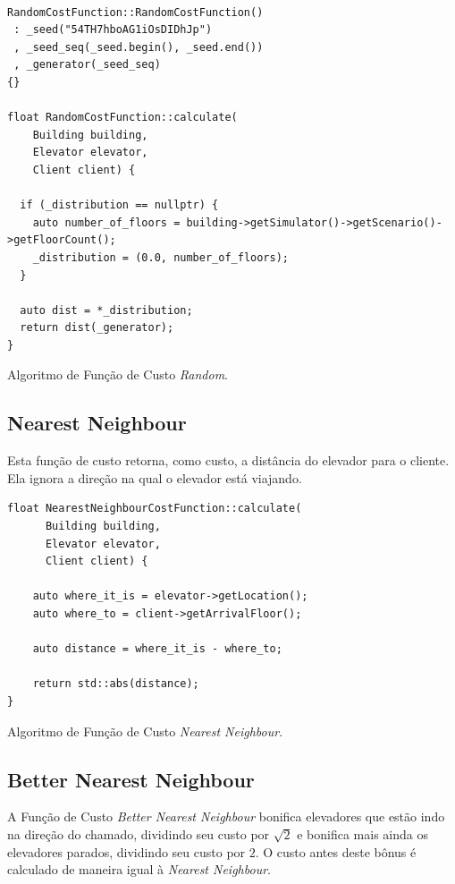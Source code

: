 \begin{algorithm}[htb!]
  \centering
  \begin{verbatim}

RandomCostFunction::RandomCostFunction()
 : _seed("54TH7hboAG1iOsDIDhJp")
 , _seed_seq(_seed.begin(), _seed.end())
 , _generator(_seed_seq)
{}

float RandomCostFunction::calculate(
    Building building,
    Elevator elevator,
    Client client) {

  if (_distribution == nullptr) {
    auto number_of_floors = building->getSimulator()->getScenario()->getFloorCount();
    _distribution = (0.0, number_of_floors);
  }

  auto dist = *_distribution;
  return dist(_generator);
}
  \end{verbatim}
  \caption{\label{alg:random_cf}Algoritmo de Função de Custo \textit{Random}.}
\end{algorithm}

\subsection{\label{model:costfunctions:nn}Nearest Neighbour}
Esta função de custo retorna, como custo, a distância do
elevador para o cliente. Ela ignora a direção na qual o elevador está viajando.

\begin{algorithm}[htb!]
  \centering
  \begin{verbatim}
float NearestNeighbourCostFunction::calculate(
      Building building,
      Elevator elevator,
      Client client) {

    auto where_it_is = elevator->getLocation();
    auto where_to = client->getArrivalFloor();

    auto distance = where_it_is - where_to;

    return std::abs(distance);
}
  \end{verbatim}
  \caption{\label{alg:nn_cf}Algoritmo de Função de Custo \textit{Nearest Neighbour}.}
\end{algorithm}

\subsection{\label{model:costfunctions:bnn}Better Nearest Neighbour}
A Função de Custo \textit{Better Nearest Neighbour} bonifica elevadores que
estão indo na direção do chamado, dividindo seu custo por $\sqrt 2$ e bonifica
mais ainda os elevadores parados, dividindo seu custo por $2$. O custo antes
deste bônus é calculado de maneira igual à \textit{Nearest Neighbour}.

